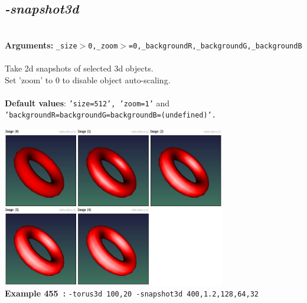\documentclass[a4paper,11pt,twoside]{book}
\begin{document}
\subsection{\emph{-snapshot3d} }\vspace*{-0.5em}
~\\\textbf{Arguments: } 
{\small \texttt{\_size$>$0,\_zoom$>$=0,\_backgroundR,\_backgroundG,\_backgroundB}}\\~\\
Take 2d snapshots of selected 3d objects.
~\\Set 'zoom' to 0 to disable object auto-scaling.
~\\~\\\textbf{Default values}: {\small \texttt{'size=512', 'zoom=1'} and \texttt{'backgroundR=backgroundG=backgroundB=(undefined)'.}}
\begin{center}\includegraphics[keepaspectratio=true,height=7cm,width=\textwidth]{img/gmic_def455.jpg}\\
{\footnotesize \textbf{Example 455~:} \texttt{-torus3d 100,20 -snapshot3d 400,1.2,128,64,32}}
\end{center}
\end{document}
